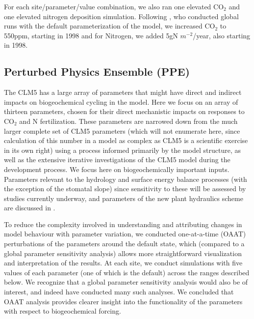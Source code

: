 \usepackage{}\documentclass[draft,linenumbers]{agujournal}
\begin{document}
For each site/parameter/value combination, we also ran one elevated CO$_{2}$ and one elevated nitrogen deposition simulation. Following \cite{wieder2019}, who conducted global runs with the default parameterization of the model, we increased CO$_{2}$ to 550ppm, starting in 1998 and for Nitrogen, we added 5gN $m^{-2}$/year, also starting in 1998. 

\subsection{Perturbed Physics Ensemble (PPE)}
The CLM5 has a large array of parameters that might have direct and indirect impacts on biogeochemical cycling in the model.  Here we focus on an array of thirteen parameters, chosen for their direct mechanistic impacts on responses to CO$_{2}$ and N fertilization. These parameters are narrowed down from the much larger complete set of CLM5 parameters (which will not enumerate here, since calculation of this number in a model as complex as CLM5 is a scientific exercise in its own right) using a process informed primarily by the model structure, as well as the extensive iterative investigations of the CLM5 model during the development process.  We focus here on biogeochemically important inputs. Parameters relevant to the hydrology and surface energy balance processes (with the exception of the stomatal slope) since sensitivity to these will be assessed by studies currently underway, and parameters of the new plant hydraulics scheme are discussed in \cite{kennedy2019}.

To reduce the complexity involved in understanding and attributing changes in model behaviour with parameter variation, we conducted one-at-a-time (OAAT) perturbations of the parameters around the default state, which (compared to a global parameter sensitivity analysis) allows more straightforward visualization and interpretation of the results.  At each site, we conduct simulations with five values of each parameter (one of which is the default) across the ranges described below. We recognize that a global parameter sensitivity analysis would also be of interest, and indeed have conducted many such analyses. We concluded that OAAT analysis provides clearer insight into the functionality of the parameters with respect to biogeochemical forcing. 
\end{document}
